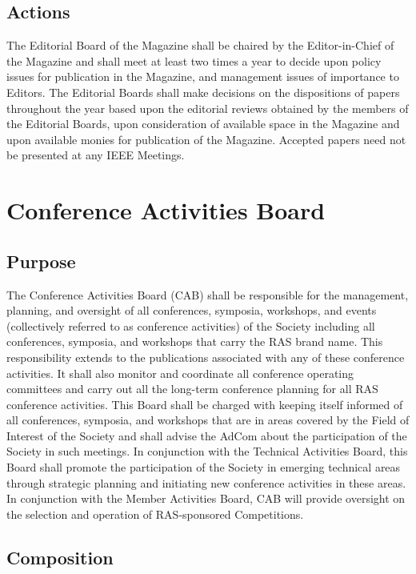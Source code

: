 \documentclass[10pt]{article}
\begin{document}
\subsection{Actions}
The Editorial Board of the Magazine shall be chaired by the Editor-in-Chief of the Magazine and shall meet at least two times a year to decide upon policy issues for publication in the Magazine, and management issues of importance to Editors.  The Editorial Boards shall make decisions on the dispositions of papers throughout the year based upon the editorial reviews obtained by the members of the Editorial Boards, upon consideration of available space in the Magazine and upon available monies for publication of the Magazine. Accepted papers need not be presented at any IEEE Meetings.


\section{Conference Activities Board}
\label{CAB}

\subsection{Purpose}

The Conference Activities Board (CAB) shall be responsible for the management, planning, and oversight of all conferences, symposia, workshops, and events (collectively referred to as conference activities) of the Society including all conferences, symposia, and workshops that carry the RAS brand name.  This responsibility extends to the publications associated with any of these conference activities. It shall also monitor and coordinate all conference operating committees and carry out all the long-term conference planning for all RAS conference activities. This Board shall be charged with keeping itself informed of all conferences, symposia, and workshops that are in areas covered by the Field of Interest of the Society and shall advise the AdCom about the participation of the Society in such meetings. In conjunction with the Technical Activities Board, this Board shall promote the participation of the Society in emerging technical areas through strategic planning and initiating new conference activities in these areas. In conjunction with the Member Activities Board, CAB will provide oversight on the selection and operation of RAS-sponsored Competitions. 


\subsection{Composition}
\end{document}
